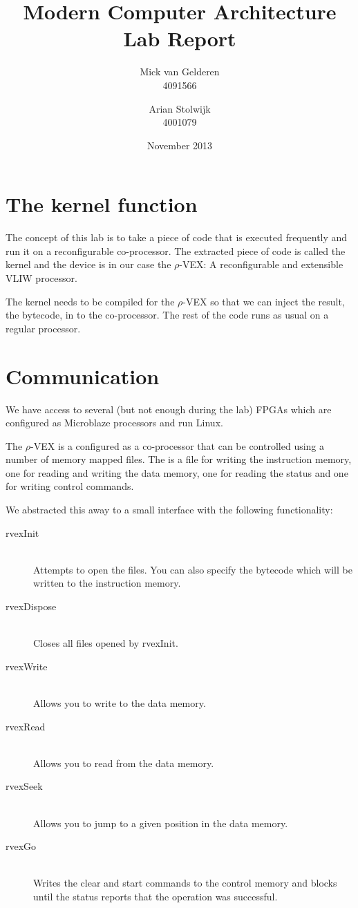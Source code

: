 \documentclass{article}
\title{Modern Computer Architecture\\Lab Report}
\author{%
    Mick van Gelderen\\4091566
    \and
    Arian Stolwijk\\4001079
}
\date{November 2013}
\newcommand{\rvex}{\ensuremath{\rho}-VEX}
\begin{document}
\maketitle

\section{The kernel function}

The concept of this lab is to take a piece of code that is executed frequently
and run it on a reconfigurable co-processor.  The extracted piece of code is
called the kernel and the device is in our case the \rvex{}: A reconfigurable
and extensible VLIW processor.

The kernel needs to be compiled for the \rvex{} so that we can inject the
result, the bytecode, in to the co-processor. The rest of the code runs as
usual on a regular processor.

\section{Communication}

We have access to several (but not enough during the lab) FPGAs which are
configured as Microblaze processors and run Linux.

The \rvex{} is a configured as a co-processor that can be controlled using a
number of memory mapped files. The is a file for writing the instruction
memory, one for reading and writing the data memory, one for reading the status
and one for writing control commands.

We abstracted this away to a small interface with the following functionality:

\begin{description}
    \item[rvexInit] \hfill \\
        Attempts to open the files. You can also specify the bytecode which
        will be written to the instruction memory.
    \item[rvexDispose] \hfill \\
        Closes all files opened by rvexInit.
    \item[rvexWrite] \hfill \\
        Allows you to write to the data memory.
    \item[rvexRead] \hfill \\
        Allows you to read from the data memory.
    \item[rvexSeek] \hfill \\
        Allows you to jump to a given position in the data memory.
    \item[rvexGo] \hfill \\
        Writes the clear and start commands to the control memory and blocks
        until the status reports that the operation was successful.
\end{description}
\end{document}
